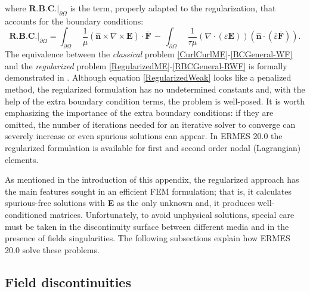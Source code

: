 where $\textbf{R.B.C.}|_{\partial\Omega}$ is the term, properly adapted to the regularization, that accounts for the boundary conditions:
\begin{equation}\label{RBCGeneral-RWF}
	\textbf{R.B.C.}|_{\partial\Omega} = \int_{\partial\Omega}\enspace\frac{1}{\mu}\left(\mathbf{\hat{n}}\times\nabla\times\mathbf{E}\right)\cdot\mathbf{\bar{F}}\, - \,\int_{\partial\Omega}\enspace\frac{1}{\tau\mu}\left(\nabla\cdot\left(\varepsilon\mathbf{E}\right)\right)\left(\mathbf{\hat{n}}\cdot\left(\bar{\varepsilon}\mathbf{\bar{F}}\right)\right).
\end{equation}
The equivalence between the \emph{classical} problem \eqref{CurlCurlME}-\eqref{BCGeneral-WF} and the \emph{regularized} problem \eqref{RegularizedME}-\eqref{RBCGeneral-RWF} is formally demonstrated in \cite{BC-OJOOut}. Although equation \eqref{RegularizedWeak} looks like a penalized method, the regularized formulation has no undetermined constants and, with the help of the extra boundary condition terms, the problem is well-posed. It is worth emphasizing the importance of the extra boundary conditions: if they are omitted, the number of iterations needed for an iterative solver to converge can severely increase or even spurious solutions can appear. In ERMES 20.0 the regularized formulation is available for first and second order nodal (Lagrangian) elements.

As mentioned in the introduction of this appendix, the regularized approach has the main features sought in an efficient FEM formulation; that is, it calculates spurious-free solutions with \textbf{E} as the only unknown and, it produces well-conditioned matrices. Unfortunately, to avoid unphysical solutions, special care must be taken in the discontinuity surface between different media and in the presence of fields singularities. The following subsections explain how ERMES 20.0 solve these problems. 

\subsection{Field discontinuities}\label{Discontinuities}

